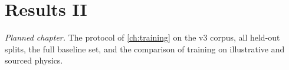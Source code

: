 \chapter{Results II}
\label{ch:results2}


\emph{Planned chapter.} The protocol of \cref{ch:training} on the v3 corpus, all held-out splits, the full baseline set, and the comparison of training on illustrative and sourced physics.

